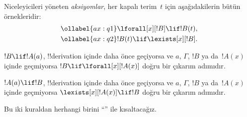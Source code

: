 



\begin{defn}
Niceleyicileri yöneten \emph{aksiyomlar}, her kapalı terim~$t$ için
aşağıdakilerin bütün örnekleridir:
\begin{align}
\ollabel{ax:q1} & \lforall[x][!B] \lif !B(t), \\
\ollabel{ax:q2} & !B(t) \lif \lexists[x][!B].
\end{align}
\end{defn}

\begin{defn}
\item $!B \lif !A(a)$, !!{derivation} içinde daha önce geçiyorsa ve $a$,
  $\Gamma$, $!B$ ya da~$!A(x)$ içinde geçmiyorsa $!B \lif
  \lforall[x][!A(x)]$ doğru bir çıkarım adımıdır.
\item $!A(a) \lif !B$, !!{derivation} içinde daha önce geçiyorsa ve $a$,
  $\Gamma$, $!B$ ya da~$!A(x)$ içinde geçmiyorsa $\lexists[x][!A(x)] \lif
  !B$ doğru bir çıkarım adımıdır.
\end{defn}

Bu iki kuraldan herhangi birini ``\QR'' ile kısaltacağız.

